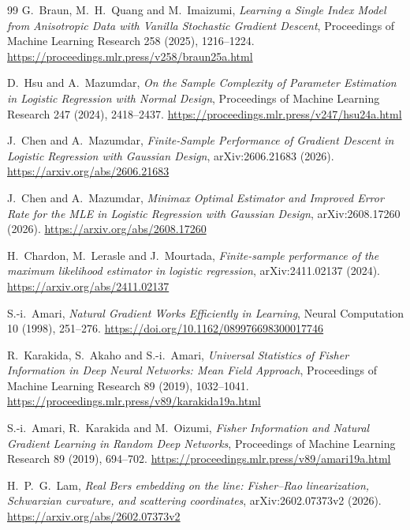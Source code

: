 \documentclass[11pt]{article}
\begin{document}
\begin{thebibliography}{99}
G.~Braun, M.~H.~Quang and M.~Imaizumi,
\emph{Learning a Single Index Model from Anisotropic Data with Vanilla Stochastic Gradient Descent},
Proceedings of Machine Learning Research 258 (2025), 1216--1224.
\url{https://proceedings.mlr.press/v258/braun25a.html}

D.~Hsu and A.~Mazumdar,
\emph{On the Sample Complexity of Parameter Estimation in Logistic Regression with Normal Design},
Proceedings of Machine Learning Research 247 (2024), 2418--2437.
\url{https://proceedings.mlr.press/v247/hsu24a.html}

J.~Chen and A.~Mazumdar,
\emph{Finite-Sample Performance of Gradient Descent in Logistic Regression with Gaussian Design},
arXiv:2606.21683 (2026).
\url{https://arxiv.org/abs/2606.21683}

J.~Chen and A.~Mazumdar,
\emph{Minimax Optimal Estimator and Improved Error Rate for the MLE in Logistic Regression with Gaussian Design},
arXiv:2608.17260 (2026).
\url{https://arxiv.org/abs/2608.17260}

H.~Chardon, M.~Lerasle and J.~Mourtada,
\emph{Finite-sample performance of the maximum likelihood estimator in logistic regression},
arXiv:2411.02137 (2024).
\url{https://arxiv.org/abs/2411.02137}

S.-i.~Amari,
\emph{Natural Gradient Works Efficiently in Learning},
Neural Computation 10 (1998), 251--276.
\url{https://doi.org/10.1162/089976698300017746}

R.~Karakida, S.~Akaho and S.-i.~Amari,
\emph{Universal Statistics of Fisher Information in Deep Neural Networks: Mean Field Approach},
Proceedings of Machine Learning Research 89 (2019), 1032--1041.
\url{https://proceedings.mlr.press/v89/karakida19a.html}

S.-i.~Amari, R.~Karakida and M.~Oizumi,
\emph{Fisher Information and Natural Gradient Learning in Random Deep Networks},
Proceedings of Machine Learning Research 89 (2019), 694--702.
\url{https://proceedings.mlr.press/v89/amari19a.html}

H.~P.~G.~Lam,
\emph{Real Bers embedding on the line: Fisher--Rao linearization, Schwarzian curvature, and scattering coordinates},
arXiv:2602.07373v2 (2026).
\url{https://arxiv.org/abs/2602.07373v2}
\end{thebibliography}
\end{document}
